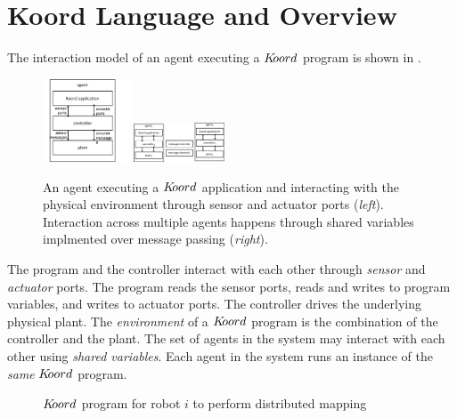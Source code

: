 \section{Koord Language and Overview}
\label{sec:semantics}
The interaction model of an agent executing a $K\kern-2pt oord$ program is shown in . 
\begin{figure}[!htbp]
\centering
\includegraphics[width=0.23\textwidth]{figs/arch.png}
\includegraphics[width=0.24\textwidth]{figs/agents2.png}
\caption{\small An agent executing a $K\kern-2pt oord$ application and interacting with the physical environment through sensor and actuator ports ({\em left}). Interaction across multiple agents happens through shared variables implmented over message passing ({\em right}).}
\label{fig:arch}
\end{figure}
The program and the controller interact with each other through {\em sensor} and {\em actuator} ports.  The program reads the sensor ports, reads and writes to program variables, and writes to actuator ports. The controller drives the underlying physical plant. The \emph{environment} of a  $K\kern-2pt oord$ program is the combination of the controller and the plant. The set of agents in the system may interact with each other using {\em shared variables\/}. Each agent in the system runs an instance of the \emph{same} $K\kern-2pt oord$ program. 
\begin{figure}[!htbp]
    \noindent
    \begin{mdframed}

    \begin{center}
        \scriptsize
        {}
        {}
    \end{center}
    \end{mdframed}

    \caption{$K\kern-2pt oord$ program for robot $i$ to perform distributed mapping}
    \label{fig:mapapp}
\end{figure}
    
